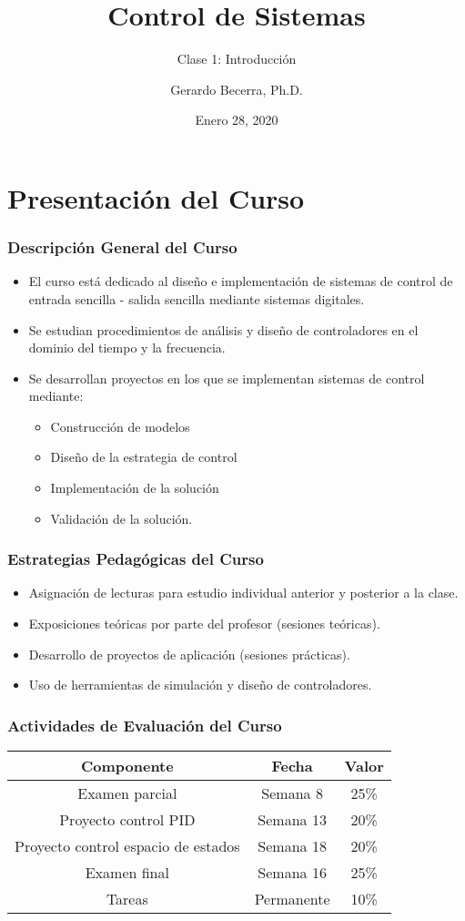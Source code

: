 \documentclass[aspectratio=169]{beamer}
\title{Control de Sistemas}
\subtitle{Clase 1: Introducción}
\author{Gerardo Becerra, Ph.D.}
\institute{Pontificia Universidad Javeriana\\ Departamento de Electrónica}
\date{Enero 28, 2020}
\theoremstyle{definition}
\theoremstyle{plain}
\theoremstyle{remark}
\begin{document}
\frame{\titlepage}	


\section{Presentación del Curso}
\begin{frame}[<+->]\frametitle{Descripción General del Curso}
\begin{itemize}
  \item El curso está dedicado al diseño e implementación de sistemas de control de entrada sencilla - salida sencilla mediante sistemas digitales.
  \item Se estudian procedimientos de análisis y diseño de controladores en el dominio del tiempo y la frecuencia.
  \item Se desarrollan proyectos en los que se implementan sistemas de control mediante:
  \begin{itemize}
    \item Construcción de modelos
    \item Diseño de la estrategia de control
    \item Implementación de la solución
    \item Validación de la solución.
  \end{itemize}
\end{itemize}
\end{frame}

\begin{frame}[<+->]\frametitle{Estrategias Pedagógicas del Curso}
\begin{itemize}
  \item Asignación de lecturas para estudio individual anterior y posterior a la clase.
  \item Exposiciones teóricas por parte del profesor (sesiones teóricas).
  \item Desarrollo de proyectos de aplicación (sesiones prácticas).
  \item Uso de herramientas de simulación y diseño de controladores.
\end{itemize}
\end{frame}

\begin{frame}[c]\frametitle{Actividades de Evaluación del Curso}
\centering
\begin{tabular}{c|c|c}
  \textbf{Componente}     & \textbf{Fecha}    & \textbf{Valor}\\
  \hline
  Examen parcial & Semana 8 & 25\% \\
  Proyecto control PID & Semana 13 & 20\% \\
  Proyecto control espacio de estados & Semana 18 & 20\% \\
  Examen final & Semana 16 & 25\% \\
  Tareas & Permanente & 10\%
\end{tabular}
\end{frame}
\end{document}
